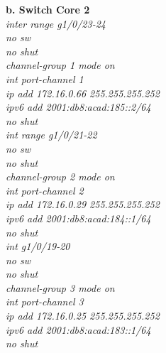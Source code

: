 \documentclass[a4paper, 12pt]{article}
\begin{document}
\hspace*{1cm}\textbf{b. Switch Core 2}\\
\hspace*{2cm}\textit{ inter range g1/0/23-24\\
\hspace*{2cm}no sw\\
\hspace*{2cm}no shut\\
\hspace*{2cm}channel-group 1 mode on\\
\hspace*{2cm}int port-channel 1\\
\hspace*{2cm}ip add 172.16.0.66 255.255.255.252\\
\hspace*{2cm}ipv6 add 2001:db8:acad:185::2/64\\
\hspace*{2cm}no shut\\
\hspace*{2cm}int range g1/0/21-22\\
\hspace*{2cm}no sw\\
\hspace*{2cm}no shut\\
\hspace*{2cm}channel-group 2 mode on\\
\hspace*{2cm}int port-channel 2\\
\hspace*{2cm}ip add 172.16.0.29 255.255.255.252\\
\hspace*{2cm}ipv6 add 2001:db8:acad:184::1/64\\
\hspace*{2cm}no shut\\
\hspace*{2cm}int g1/0/19-20\\
\hspace*{2cm}no sw\\
\hspace*{2cm}no shut\\
\hspace*{2cm}channel-group 3 mode on\\
\hspace*{2cm}int port-channel 3\\
\hspace*{2cm}ip add 172.16.0.25 255.255.255.252\\
\hspace*{2cm}ipv6 add 2001:db8:acad:183::1/64\\
\hspace*{2cm}no shut\\}
\end{document}
